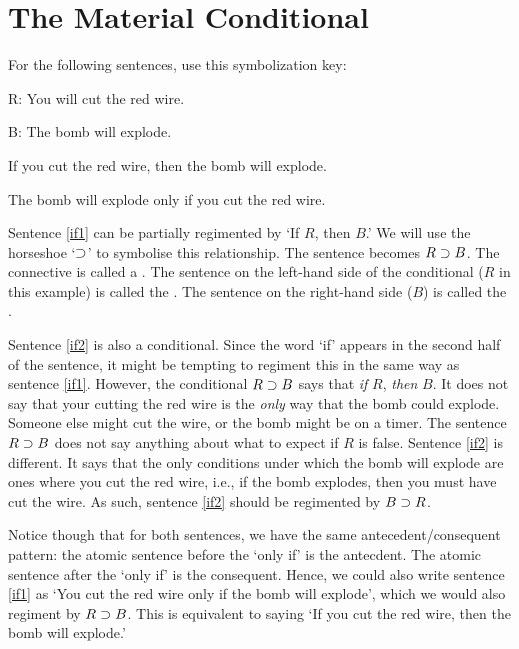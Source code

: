 \section{The Material Conditional}
For the following sentences, use this symbolization key:

\begin{ekey}
\item[R:] You will cut the red wire.
\item[B:] The bomb will explode.
\end{ekey}

\begin{earg}
\item[\ex{if1}] If you cut the red wire, then the bomb will explode.
\item[\ex{if2}] The bomb will explode only if you cut the red wire.
\end{earg}

Sentence \ref{if1} can be partially regimented by `If $R$, then $B$.'
We will use the horseshoe `$\supset$' to symbolise this relationship.
The sentence becomes $R\supset B$.
The connective is called a .
The sentence on the left-hand side of the conditional ($R$ in this example) is called the .
The sentence on the right-hand side ($B$) is called the .

Sentence \ref{if2} is also a conditional.
Since the word `if' appears in the second half of the sentence, it might be tempting to regiment this in the same way as sentence \ref{if1}.
However, the conditional $R\supset B$ says that \emph{if} $R$, \emph{then} $B$.
It does not say that your cutting the red wire is the \emph{only} way that the bomb could explode.
Someone else might cut the wire, or the bomb might be on a timer.
The sentence $R\supset B$ does not say anything about what to expect if $R$ is false. 
Sentence \ref{if2} is different.
It says that the only conditions under which the bomb will explode are ones where you cut the red wire, i.e., if the bomb explodes, then you must have cut the wire.
As such, sentence \ref{if2} should be regimented by $B \supset R$. 

Notice though that for both sentences, we have the same antecedent/consequent pattern: the atomic sentence before the `only if' is the antecdent.
The atomic sentence after the `only if' is the consequent.
Hence, we could also write sentence \ref{if1} as `You cut the red wire only if the bomb will explode', which we would also regiment by $R\supset B$.
This is equivalent to saying `If you cut the red wire, then the bomb will explode.' 

